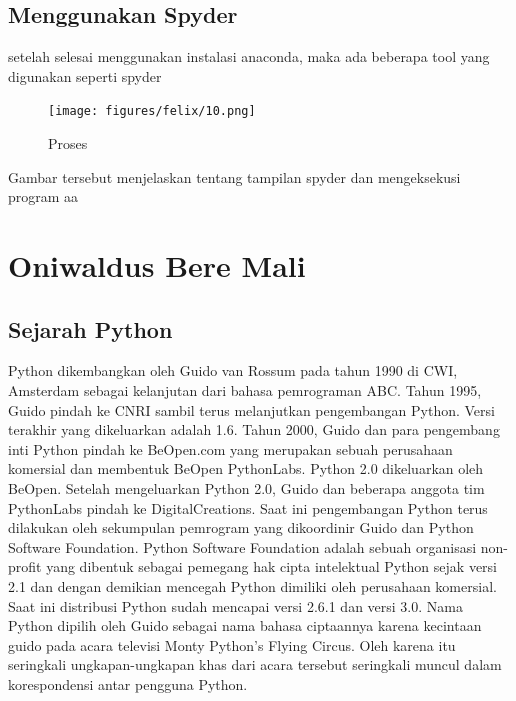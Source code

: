 \subsection{Menggunakan Spyder}
setelah selesai menggunakan instalasi anaconda,  maka ada beberapa tool yang digunakan seperti spyder
\begin{figure}[!htbp]
        \centering
        \texttt{[image: figures/felix/10.png]}
        \caption{Proses}
        \label{awal}
        \end{figure}

Gambar tersebut menjelaskan tentang tampilan spyder dan mengeksekusi program aa



\section{Oniwaldus Bere Mali}
\subsection{Sejarah Python}
              Python dikembangkan oleh Guido van Rossum pada tahun 1990 di CWI, Amsterdam sebagai kelanjutan dari bahasa pemrograman ABC. Tahun 1995, Guido pindah ke CNRI sambil terus melanjutkan pengembangan Python. Versi terakhir yang dikeluarkan adalah 1.6. Tahun 2000, Guido dan para pengembang inti Python pindah ke BeOpen.com yang merupakan sebuah perusahaan komersial dan membentuk BeOpen PythonLabs. Python 2.0 dikeluarkan oleh BeOpen. Setelah mengeluarkan Python 2.0, Guido dan beberapa anggota tim PythonLabs pindah ke DigitalCreations. Saat ini pengembangan Python terus dilakukan oleh sekumpulan pemrogram yang dikoordinir Guido dan Python Software Foundation. Python Software Foundation adalah sebuah organisasi non-profit yang dibentuk sebagai pemegang hak cipta intelektual Python sejak versi 2.1 dan dengan demikian mencegah Python dimiliki oleh perusahaan komersial. Saat ini distribusi Python sudah mencapai versi 2.6.1 dan versi 3.0. Nama Python dipilih oleh Guido sebagai nama bahasa ciptaannya karena kecintaan guido pada acara televisi Monty Python's Flying Circus. Oleh karena itu seringkali ungkapan-ungkapan khas dari acara tersebut seringkali muncul dalam korespondensi antar pengguna Python. 

